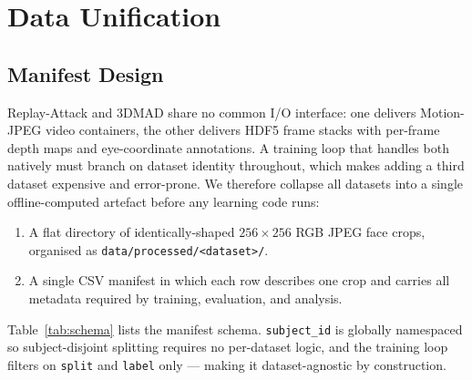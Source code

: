 \documentclass[anonymous, manuscript, screen, review]{acmart}
\begin{document}
\section{Data Unification}
\label{sec:data}

\subsection{Manifest Design}

Replay-Attack and 3DMAD share no common I/O interface: one delivers
Motion-JPEG video containers, the other delivers HDF5 frame stacks
with per-frame depth maps and eye-coordinate annotations. A training
loop that handles both natively must branch on dataset identity
throughout, which makes adding a third dataset expensive and error-prone.
We therefore collapse all datasets into a single offline-computed
artefact before any learning code runs:

\begin{enumerate}[leftmargin=*,topsep=2pt,itemsep=1pt]
\item A flat directory of identically-shaped $256{\times}256$ RGB JPEG
   face crops, organised as \texttt{data/processed/<dataset>/}.
\item A single CSV manifest in which each row describes one crop and
   carries all metadata required by training, evaluation, and analysis.
\end{enumerate}

Table~\ref{tab:schema} lists the manifest schema. \texttt{subject\_id}
is globally namespaced so subject-disjoint splitting requires no
per-dataset logic, and the training loop filters on \texttt{split} and
\texttt{label} only --- making it dataset-agnostic by construction.
\end{document}
